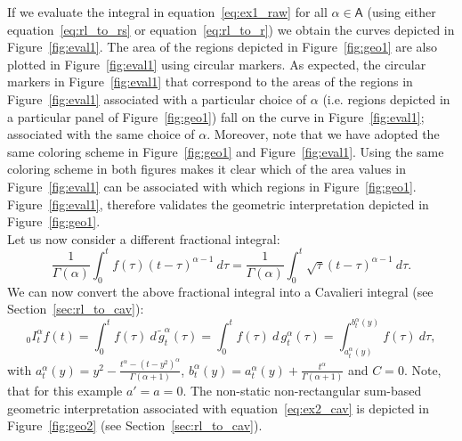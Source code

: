 \documentclass[twoside,reqno,11pt]{fcaa-var} %
\begin{document}
\noindent
If we evaluate the integral in equation~\eqref{eq:ex1_raw} for all $\alpha\in \mathsf{A}$ (using either equation~\eqref{eq:rl_to_rs} or equation~\eqref{eq:rl_to_r}) we obtain the curves depicted in Figure~\ref{fig:eval1}. The area of the regions depicted in Figure~\ref{fig:geo1} are also plotted in Figure~\ref{fig:eval1} using circular markers. As expected, the circular markers in Figure~\ref{fig:eval1} that correspond to the areas of the regions in Figure~\ref{fig:eval1} associated with a particular choice of $\alpha$ (i.e. regions depicted in a particular panel of Figure~\ref{fig:geo1}) fall on the curve in Figure~\ref{fig:eval1}; associated with the same choice of $\alpha$. Moreover, note that we have adopted the same coloring scheme in Figure~\ref{fig:geo1} and Figure~\ref{fig:eval1}. Using the same coloring scheme in both figures makes it clear which of the area values in Figure~\ref{fig:eval1} can be associated with which regions in Figure~\ref{fig:geo1}. Figure~\ref{fig:eval1}, therefore validates the geometric interpretation depicted in Figure~\ref{fig:geo1}. \\

\noindent
Let us now consider a different fractional integral:
\begin{equation}
\label{eq:ex2}
\frac{1}{\Gamma(\alpha)}\int_0^t f(\tau) (t-\tau)^{\alpha-1}~d\tau = \frac{1}{\Gamma(\alpha)}\int_0^t \sqrt{\tau}(t-\tau)^{\alpha-1}~d\tau. 
\end{equation}
We can now convert the above fractional integral into a Cavalieri integral (see Section~\ref{sec:rl_to_cav}):
\begin{equation}
\label{eq:ex2_cav}
_0I_t^{\alpha} f(t) = \int_0^t f(\tau)~d\,\widetilde{g}_t^{\alpha}(\tau)=\int_0^t f(\tau)~d\,g_t^{\alpha}(\tau)=\int_{a_t^{\alpha}(y)}^{b_t^{\alpha}(y)} f(\tau)~d\tau,
\end{equation}
with $a_t^{\alpha}(y) = y^2 - \frac{t^{\alpha}-(t-y^2)^{\alpha}}{\Gamma(\alpha+1)}$, $b_t^{\alpha}(y) = a_t^{\alpha}(y) + \frac{t^{\alpha}}{\Gamma(\alpha+1)}$ and $C=0$.
Note, that for this example $a'=a=0$. The non-static non-rectangular sum-based geometric interpretation associated with equation~\eqref{eq:ex2_cav} is depicted in Figure~\ref{fig:geo2} (see Section~\ref{sec:rl_to_cav}).
\end{document}
